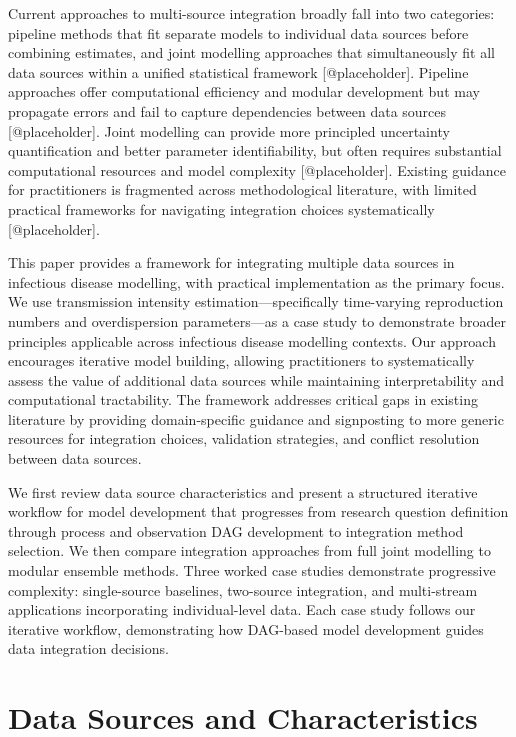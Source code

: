 \documentclass{article}
\begin{document}
Current approaches to multi-source integration broadly fall into two categories: pipeline methods that fit separate models to individual data sources before combining estimates, and joint modelling approaches that simultaneously fit all data sources within a unified statistical framework [@placeholder].
Pipeline approaches offer computational efficiency and modular development but may propagate errors and fail to capture dependencies between data sources [@placeholder].
Joint modelling can provide more principled uncertainty quantification and better parameter identifiability, but often requires substantial computational resources and model complexity [@placeholder].
Existing guidance for practitioners is fragmented across methodological literature, with limited practical frameworks for navigating integration choices systematically [@placeholder].

This paper provides a framework for integrating multiple data sources in infectious disease modelling, with practical implementation as the primary focus.
We use transmission intensity estimation—specifically time-varying reproduction numbers and overdispersion parameters—as a case study to demonstrate broader principles applicable across infectious disease modelling contexts.
Our approach encourages iterative model building, allowing practitioners to systematically assess the value of additional data sources while maintaining interpretability and computational tractability.
The framework addresses critical gaps in existing literature by providing domain-specific guidance and signposting to more generic resources for integration choices, validation strategies, and conflict resolution between data sources.

We first review data source characteristics and present a structured iterative workflow for model development that progresses from research question definition through process and observation DAG development to integration method selection.
We then compare integration approaches from full joint modelling to modular ensemble methods.
Three worked case studies demonstrate progressive complexity: single-source baselines, two-source integration, and multi-stream applications incorporating individual-level data.
Each case study follows our iterative workflow, demonstrating how DAG-based model development guides data integration decisions.

\section{Data Sources and Characteristics}
\end{document}

